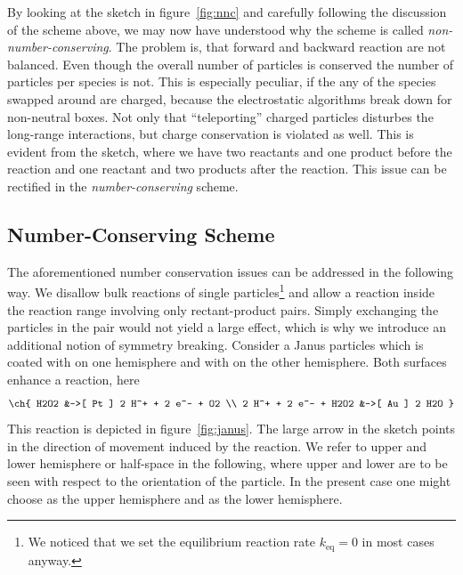 \documentclass[aip,jcp,reprint,a4paper,onecolumn,nofootinbib,amsmath,amssymb]{revtex4-1}
\begin{document}
By looking at the sketch in figure~\ref{fig:nnc} and carefully
following the discussion of the scheme above, we may now have
understood why the scheme is called \emph{non-number-conserving}.  The
problem is, that forward and backward reaction are not balanced.  Even
though the overall number of particles is conserved the number of
particles per species is not.  This is especially peculiar, if the any
of the species swapped around are charged, because the electrostatic
algorithms break down for non-neutral boxes.  Not only that
``teleporting'' charged particles disturbes the long-range
interactions, but charge conservation is violated as well.  This is
evident from the sketch, where we have two reactants and one product
before the reaction and one reactant and two products after the
reaction.  This issue can be rectified in the \emph{number-conserving}
scheme.

\subsection{Number-Conserving Scheme}

The aforementioned number conservation issues can be addressed in the
following way.  We disallow bulk reactions of single
particles\footnote{We noticed that we set the equilibrium reaction
  rate $k_{\text{eq}} = 0$ in most cases anyway.} and allow a reaction
inside the reaction range involving only rectant-product pairs.
Simply exchanging the particles in the pair would not yield a large
effect, which is why we introduce an additional notion of symmetry
breaking.  Consider a Janus particles which is coated with  on
one hemisphere and with  on the other hemisphere.  Both
surfaces enhance a reaction, here\cite{Gibbs_10,Wheat_10}
\begin{align}
  \label{eq:H2O2}
  \ch{
    H2O2 &->[ Pt ] 2 H^+ + 2 e^- + O2 \\
    2 H^+ + 2 e^- + H2O2 &->[ Au ] 2 H2O
  }
\end{align}
This reaction is depicted in figure~\ref{fig:janus}.  The large arrow in
the sketch points in the direction of movement induced by the
reaction.  We refer to upper and lower hemisphere or half-space in the
following, where upper and lower are to be seen with respect to the
orientation of the particle.  In the present case one might choose
 as the upper hemisphere and  as the lower hemisphere.
\end{document}
